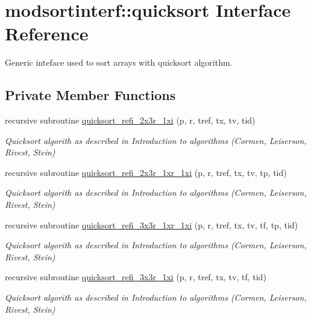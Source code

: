 \hypertarget{interfacemodsortinterf_1_1quicksort}{\section{modsortinterf\-:\-:quicksort Interface Reference}
\label{interfacemodsortinterf_1_1quicksort}
}


Generic inteface used to sort arrays with quicksort algorithm.  


\subsection*{Private Member Functions}
\begin{DoxyCompactItemize}
\item 
recursive subroutine \hyperlink{interfacemodsortinterf_1_1quicksort_a88e479f171ee05e6abb21a575e1adeba}{quicksort\-\_\-refi\-\_\-2x3r\-\_\-1xi} (p, r, tref, tx, tv, tid)
\begin{DoxyCompactList}\small\item\em Quicksort algorith as described in Introduction to algorithms (Cormen, Leiserson, Rivest, Stein) \end{DoxyCompactList}\item 
recursive subroutine \hyperlink{interfacemodsortinterf_1_1quicksort_a7fbea10343fd99b63db7567ea5144ede}{quicksort\-\_\-refi\-\_\-2x3r\-\_\-1xr\-\_\-1xi} (p, r, tref, tx, tv, tp, tid)
\begin{DoxyCompactList}\small\item\em Quicksort algorith as described in Introduction to algorithms (Cormen, Leiserson, Rivest, Stein) \end{DoxyCompactList}\item 
recursive subroutine \hyperlink{interfacemodsortinterf_1_1quicksort_a237ac7aee8dc5e42d744ff43931172c7}{quicksort\-\_\-refi\-\_\-3x3r\-\_\-1xr\-\_\-1xi} (p, r, tref, tx, tv, tf, tp, tid)
\begin{DoxyCompactList}\small\item\em Quicksort algorith as described in Introduction to algorithms (Cormen, Leiserson, Rivest, Stein) \end{DoxyCompactList}\item 
recursive subroutine \hyperlink{interfacemodsortinterf_1_1quicksort_aec3f4280d2579e6d98acd38398728d28}{quicksort\-\_\-refi\-\_\-3x3r\-\_\-1xi} (p, r, tref, tx, tv, tf, tid)
\begin{DoxyCompactList}\small\item\em Quicksort algorith as described in Introduction to algorithms (Cormen, Leiserson, Rivest, Stein) \end{DoxyCompactList}\end{DoxyCompactItemize}



